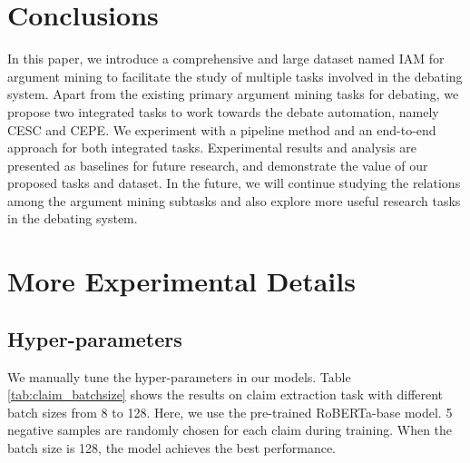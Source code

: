 \documentclass[11pt]{article}
\begin{document}
\section{Conclusions}
In this paper, we introduce a comprehensive and large dataset named IAM for argument mining to facilitate the study of multiple tasks involved in the debating system.
Apart from the existing primary argument mining tasks for debating, we propose two integrated tasks to work towards the debate automation, namely CESC and CEPE.
We experiment with a pipeline method and an end-to-end approach for both integrated tasks.
Experimental results and analysis are presented as baselines for future research, and demonstrate the value of our proposed tasks and dataset.
In the future, we will continue studying the relations among the argument mining subtasks and also explore more useful research tasks in the debating system.


\nocite{*}




\clearpage
\appendix

\section{More Experimental Details}
\label{sec:appen_hyper}

\subsection{Hyper-parameters}

We manually tune the hyper-parameters in our models.
Table \ref{tab:claim_batchsize} shows the results on claim extraction task with different batch sizes from 8 to 128. Here, we use the pre-trained RoBERTa-base model. 5 negative samples are randomly chosen for each claim during training.
When the batch size is 128, the model achieves the best performance.


\begin{table}[H]
	\centering
{}
\caption{Claim extraction performance with different batch sizes.
    }
	\label{tab:claim_batchsize}
\end{table}
\end{document}
